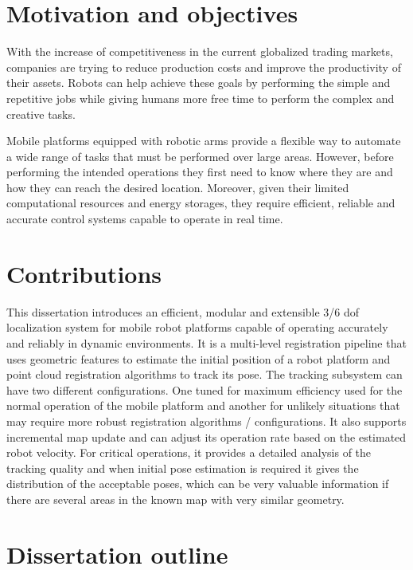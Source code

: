 \section{Motivation and objectives} \label{sec:introduction_goals}

With the increase of competitiveness in the current globalized trading markets, companies are trying to reduce production costs and improve the productivity of their assets. Robots can help achieve these goals by performing the simple and repetitive jobs while giving humans more free time to perform the complex and creative tasks.

Mobile platforms equipped with robotic arms provide a flexible way to automate a wide range of tasks that must be performed over large areas. However, before performing the intended operations they first need to know where they are and how they can reach the desired location. Moreover, given their limited computational resources and energy storages, they require efficient, reliable and accurate control systems capable to operate in real time.



\section{Contributions} \label{sec:introduction_contributions}

This dissertation introduces an efficient, modular and extensible 3/6 \gls{dof} localization system for mobile robot platforms capable of operating accurately and reliably in dynamic environments. It is a multi-level registration pipeline that uses geometric features to estimate the initial position of a robot platform and point cloud registration algorithms to track its pose. The tracking subsystem can have two different configurations. One tuned for maximum efficiency used for the normal operation of the mobile platform and another for unlikely situations that may require more robust registration algorithms / configurations. It also supports incremental map update and can adjust its operation rate based on the estimated robot velocity. For critical operations, it provides a detailed analysis of the tracking quality and when initial pose estimation is required it gives the distribution of the acceptable poses, which can be very valuable information if there are several areas in the known map with very similar geometry.



\section{Dissertation outline} \label{sec:introduction_structure}

